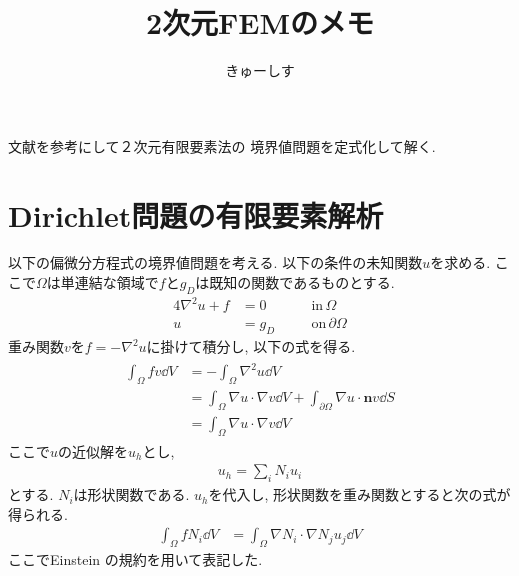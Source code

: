 \documentclass[paper=a4]{jlreq}
\begin{document}
\title{2次元FEMのメモ}
\author{きゅーしす}
\date{}
\maketitle

文献\cite{Larson2013}を参考にして２次元有限要素法の
境界値問題を定式化して解く.

\section{Dirichlet問題の有限要素解析}
以下の偏微分方程式の境界値問題を考える.
以下の条件の未知関数$u$を求める. 
ここで$\Omega$は単連結な領域で$f$と$g_D$は既知の関数であるものとする.
\begin{alignat}{4}
    \nabla^2 u + f &= 0 &\quad& \mathrm{in}\, \Omega \label{eq:poisson}\\
    u &= g_D &\quad& \mathrm{on}\, \partial\Omega \label{eq:dirichlet_bc}
\end{alignat}
重み関数$v$を$f = -\nabla^2 u$に掛けて積分し, 以下の式を得る.
\begin{align}
    \begin{split}
        \int_\Omega fv\dd{V} &= -\int_\Omega \nabla^2 u \dd{V} \\
        &= \int_\Omega \nabla u\cdot \nabla v \dd{V} 
        + \int_{\partial\Omega} \nabla u \cdot \bm{n} v \dd{S} \\
        &=  \int_\Omega \nabla u\cdot \nabla v \dd{V}
    \end{split}
\end{align}
ここで$u$の近似解を$u_h$とし, 
\begin{align}
    u_h = \sum_iN_iu_i
\end{align}
とする. $N_i$は形状関数である.
$u_h$を代入し, 形状関数を重み関数とすると次の式が得られる.
\begin{align}
    \int_\Omega fN_i\dd{V} &=  \int_\Omega \nabla N_i \cdot \nabla N_j u_j \dd{V} \label{eq:weak_form}
\end{align}
ここでEinstein の規約を用いて表記した.
\end{document}
